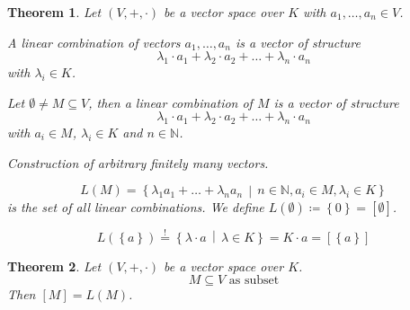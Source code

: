\documentclass[a4paper,landscape,twocolumn]{article}
\newcommand\set[1]{\left\{#1\right\}}
\newcommand\setdef[2]{\left\{#1\,\middle|\,#2\right\}}
\newtheorem{theorem}{Theorem}[section]
\begin{document}
\begin{theorem}
  \label{linear-comb}
  Let $(V, +, \cdot)$ be a vector space over $K$ with $a_1, \ldots, a_n \in V$.

  A \emph{linear combination} of vectors $a_1, \ldots, a_n$ is a vector of structure
  \[ \lambda_1 \cdot a_1 + \lambda_2 \cdot a_2 + \ldots + \lambda_n \cdot a_n \]
  with $\lambda_i \in K$.

  Let $\emptyset \neq M \subseteq V$, then a linear combination of $M$ is a vector of structure
  \[ \lambda_1 \cdot a_1 + \lambda_2 \cdot a_2 + \ldots + \lambda_n \cdot a_n \]
  with $a_i \in M$, $\lambda_i \in K$ and $n \in \mathbb N$.

  Construction of arbitrary finitely many vectors.

  \[ L(M) = \setdef{\lambda_1 a_1 + \ldots + \lambda_n a_n}{n \in \mathbb N, a_i \in M, \lambda_i \in K} \]
  is the set of all linear combinations.
  We define $L(\emptyset) \coloneqq \set{0} = \left[\emptyset\right]$.

  \[ L(\set{a}) \stackrel!= \setdef{\lambda \cdot a}{\lambda \in K} = K \cdot a = \left[\set{a}\right] \]
\end{theorem}

\begin{theorem}
  \label{satz-3-12}
  Let $(V, +, \cdot)$ be a vector space over $K$.
  \[ M \subseteq V \text{ as subset} \]
  Then $[M] = L(M)$.
\end{theorem}
\end{document}
